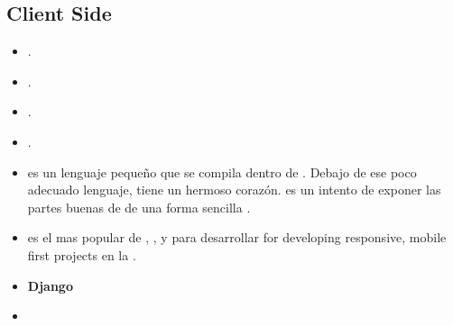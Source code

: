 \subsection{Client Side}
\begin{itemize}
	\item \textbf{\angularjs} \cite{technology_angularjs}.
	\item \textbf{\emberjs}\cite{online_technology_emberjs}.
	\item \textbf{\backbonejs}\cite{online_technology_backbone}.
	
	\item \textbf{\meteor}.
	
	\item \textbf{\coffeescript} es un lenguaje pequeño que se compila dentro de \javascript. Debajo de ese poco adecuado lenguaje, \javascript tiene un hermoso corazón. \coffeescript es un intento de exponer las partes buenas de \javascript de una forma sencilla \cite{technology_coffeescript}.
	
	
	
	\item \textbf{\bootstrap} es el \framework mas popular de \html, \css, y \javascript para desarrollar  for developing responsive, mobile first projects en la \web \cite{technology_bootstrap}.
\end{itemize}

\begin{itemize}
	\item \textbf{Django}
	\item \textbf{\grunttool} \cite{technology_gruntjs}
\end{itemize}


